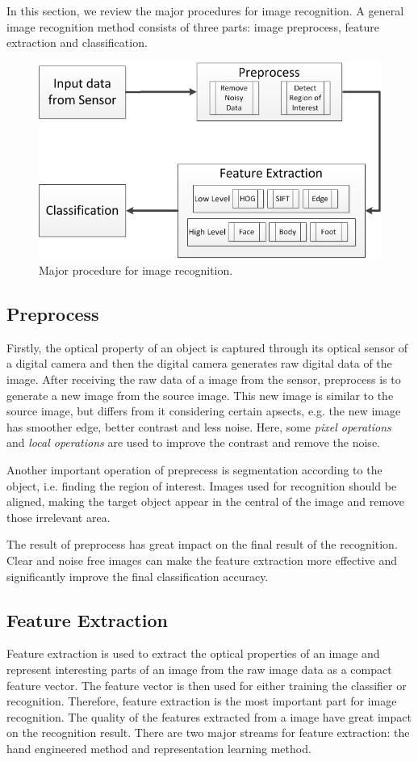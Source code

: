 In this section, we review the major procedures for image recognition. 
A general image recognition method consists of three parts: image preprocess, feature extraction and classification.

\begin{figure}
	\centering
	\includegraphics[scale=.8]{introduction/fig/IRflow.png}
	\caption{Major procedure for image recognition.}\label{fig:intro:irflow}
\end{figure}
\subsection{Preprocess}
Firstly, the optical property of an object is captured through its optical sensor of a digital camera and then the digital camera generates raw digital data of the image.
After receiving the raw data of a image from the sensor, preprocess is to generate a new image from the source image. This new image is similar to the source image, but differs from it considering certain apsects, e.g. the new image has smoother edge, better contrast and less noise. 
Here, some \textit{pixel operations} and \textit{local operations} are used to improve the contrast and remove the noise.  

Another important operation of preprecess is segmentation according to the object, i.e. finding the region of interest. Images used for recognition should be aligned, making the target object appear in the central of the image and remove those irrelevant area.

The result of preprocess has great impact on the final result of the recognition. Clear and noise free images can make the feature extraction more effective and significantly improve the final classification accuracy.

\subsection{Feature Extraction}
Feature extraction is used to extract the optical properties of an image and represent interesting parts of an image from the raw image data as a compact feature vector. The feature vector is then used for either training the classifier or recognition. Therefore, feature extraction is the most important part for image recognition. The quality of the features extracted from a image have great impact on the recognition result. There are two major streams for feature extraction: the hand engineered method and representation learning method.
